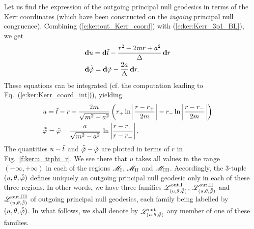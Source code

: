 Let us find
the expression of the outgoing principal null geodesics in terms of
the Kerr coordinates (which have been constructed on the
\emph{ingoing} principal null congruence).
Combining (\ref{e:ker:out_Kerr_coord}) with (\ref{e:ker:Kerr_3p1_BL}),
we get
\begin{subequations}
\label{e:ker:out_Kerr_Kerr_3p1}
\begin{align}
& \mathbf{d} u = \mathbf{d} {\tilde t} - \frac{r^2 + 2m r + a^2}{\Delta} \, \mathbf{d} r \\
& \mathbf{d} \tilde{{\tilde\varphi}} = \mathbf{d} {\tilde\varphi} - \frac{2a}{\Delta}\, \mathbf{d} r .
\end{align}
\end{subequations}
These equations can be integrated (cf. the computation leading to Eq.~(\ref{e:ker:Kerr_coord_int})), yielding
\begin{subequations}
\label{e:ker:out_princ_geod}
\begin{align}
& u = {\tilde t} - r - \frac{2m}{\sqrt{m^2-a^2}} \left(
    r_+ \ln\left| \frac{r-r_+}{2m} \right|
    - r_- \ln\left| \frac{r-r_-}{2m} \right| \right) \label{e:ker:out_princ_geod_u} \\
&  \tilde{{\tilde\varphi}} = {\tilde\varphi} - \frac{a}{\sqrt{m^2-a^2}}\, \ln \left|
    \frac{r-r_+}{r-r_-} \right|  ,  \label{e:ker:out_princ_geod_ttph}
\end{align}
\end{subequations}
The quantities $u - {\tilde t}$ and $\tilde{{\tilde\varphi}} - {\tilde\varphi}$ are plotted in terms of
$r$ in Fig.~\ref{f:ker:u_ttphi_r}. We see there that $u$ takes all values
in the range $(-\infty,+\infty)$ in each of the regions $\mathscr{M}_{\rm I}$,
$\mathscr{M}_{\rm II}$ and $\mathscr{M}_{\rm III}$. Accordingly, the 3-tuple
$(u,\theta,\tilde{{\tilde\varphi}})$ defines uniquely an outgoing principal null geodesic
only in each of these three regions. In other words, we have three families
$\mathscr{L}^{\rm out,I}_{(u,\theta,\tilde{{\tilde\varphi}})}$,
$\mathscr{L}^{\rm out,II}_{(u,\theta,\tilde{{\tilde\varphi}})}$ and
$\mathscr{L}^{\rm out,III}_{(u,\theta,\tilde{{\tilde\varphi}})}$ of
outgoing principal null geodesics, each family being labelled by $(u,\theta,\tilde{{\tilde\varphi}})$.
In what follows, we shall denote by $\mathscr{L}^{\rm out}_{(u,\theta,\tilde{{\tilde\varphi}})}$ any
member of one of these families.



